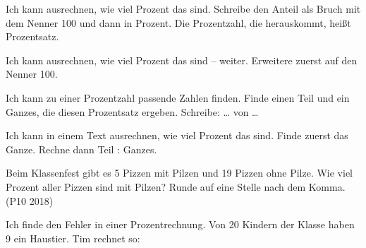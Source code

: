 \begin{aufgabe}{Ich kann ausrechnen, wie viel Prozent das sind. Schreibe den Anteil als Bruch mit dem Nenner 100 und dann in Prozent. Die Prozentzahl, die herauskommt, heißt Prozentsatz.}
\end{aufgabe}

\begin{aufgabe}{Ich kann ausrechnen, wie viel Prozent das sind – weiter. Erweitere zuerst auf den Nenner 100.}
\end{aufgabe}

\begin{aufgabe}{Ich kann zu einer Prozentzahl passende Zahlen finden. Finde einen Teil und ein Ganzes, die diesen Prozentsatz ergeben. Schreibe: \dots{} von \dots}
\end{aufgabe}

\begin{aufgabe}{Ich kann in einem Text ausrechnen, wie viel Prozent das sind. Finde zuerst das Ganze. Rechne dann Teil : Ganzes.}
\begin{teile}
\teil Beim Klassenfest gibt es 5 Pizzen mit Pilzen und 19 Pizzen ohne Pilze. Wie viel Prozent aller Pizzen sind mit Pilzen? Runde auf eine Stelle nach dem Komma. (P10 2018)
\end{teile}
\end{aufgabe}

\begin{aufgabe}{Ich finde den Fehler in einer Prozentrechnung. Von 20 Kindern der Klasse haben 9 ein Haustier. Tim rechnet so:}
\end{aufgabe}

